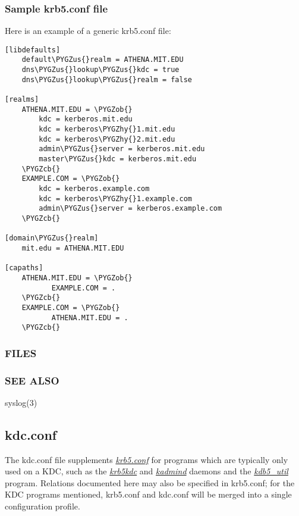 \documentclass[letterpaper,10pt,english]{sphinxmanual}
\def\PYGZus{\char`\_}
\def\PYGZob{\char`\{}
\def\PYGZcb{\char`\}}
\def\PYGZhy{\char`\-}
\begin{document}
\subsubsection{Sample krb5.conf file}
\label{admin/conf_files/krb5_conf:sample-krb5-conf-file}
Here is an example of a generic krb5.conf file:

\begin{Verbatim}[commandchars=\\\{\}]
[libdefaults]
    default\PYGZus{}realm = ATHENA.MIT.EDU
    dns\PYGZus{}lookup\PYGZus{}kdc = true
    dns\PYGZus{}lookup\PYGZus{}realm = false

[realms]
    ATHENA.MIT.EDU = \PYGZob{}
        kdc = kerberos.mit.edu
        kdc = kerberos\PYGZhy{}1.mit.edu
        kdc = kerberos\PYGZhy{}2.mit.edu
        admin\PYGZus{}server = kerberos.mit.edu
        master\PYGZus{}kdc = kerberos.mit.edu
    \PYGZcb{}
    EXAMPLE.COM = \PYGZob{}
        kdc = kerberos.example.com
        kdc = kerberos\PYGZhy{}1.example.com
        admin\PYGZus{}server = kerberos.example.com
    \PYGZcb{}

[domain\PYGZus{}realm]
    mit.edu = ATHENA.MIT.EDU

[capaths]
    ATHENA.MIT.EDU = \PYGZob{}
           EXAMPLE.COM = .
    \PYGZcb{}
    EXAMPLE.COM = \PYGZob{}
           ATHENA.MIT.EDU = .
    \PYGZcb{}
\end{Verbatim}


\subsubsection{FILES}
\label{admin/conf_files/krb5_conf:files}


\subsubsection{SEE ALSO}
\label{admin/conf_files/krb5_conf:see-also}
syslog(3)


\subsection{kdc.conf}
\label{admin/conf_files/kdc_conf:kdc-conf}\label{admin/conf_files/kdc_conf::doc}\label{admin/conf_files/kdc_conf:kdc-conf-5}
The kdc.conf file supplements {\hyperref[admin/conf_files/krb5_conf:krb5-conf-5]{\emph{krb5.conf}}} for programs which
are typically only used on a KDC, such as the {\hyperref[admin/admin_commands/krb5kdc:krb5kdc-8]{\emph{krb5kdc}}} and
{\hyperref[admin/admin_commands/kadmind:kadmind-8]{\emph{kadmind}}} daemons and the {\hyperref[admin/admin_commands/kdb5_util:kdb5-util-8]{\emph{kdb5\_util}}} program.
Relations documented here may also be specified in krb5.conf; for the
KDC programs mentioned, krb5.conf and kdc.conf will be merged into a
single configuration profile.
\end{document}
